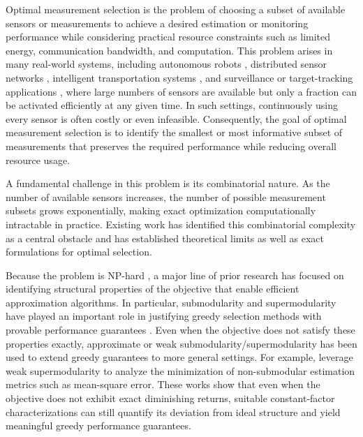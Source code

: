 \documentclass[letterpaper, 10 pt, conference]{ieeeconf}  %
\begin{document}
Optimal measurement selection is the problem of choosing a subset of available sensors or measurements to achieve a desired estimation or monitoring performance while considering practical resource constraints such as limited energy, communication bandwidth, and computation. This problem arises in many real-world systems, including autonomous robots \cite{c1,c2}, distributed sensor networks \cite{c3,c4}, intelligent transportation systems \cite{c5}, and surveillance or target-tracking applications \cite{c6,c7}, where large numbers of sensors are available but only a fraction can be activated efficiently at any given time. In such settings, continuously using every sensor is often costly or even infeasible. Consequently, the goal of optimal measurement selection is to identify the smallest or most informative subset of measurements that preserves the required performance while reducing overall resource usage.

A fundamental challenge in this problem is its combinatorial nature. As the number of available sensors increases, the number of possible measurement subsets grows exponentially, making exact optimization computationally intractable in practice. Existing work \cite{c8,c9,c10} has identified this combinatorial complexity as a central obstacle and has established theoretical limits as well as exact formulations for optimal selection.

Because the problem is NP-hard \cite{c10,c11}, a major line of prior research has focused on identifying structural properties of the objective that enable efficient approximation algorithms. In particular, submodularity and supermodularity have played an important role in justifying greedy selection methods with provable performance guarantees \cite{c12,c13,c14}. Even when the objective does not satisfy these properties exactly, approximate or weak submodularity/supermodularity has been used to extend greedy guarantees to more general settings. For example, \cite{c15,c16} leverage weak supermodularity to analyze the minimization of non-submodular estimation metrics such as mean-square error. These works show that even when the objective does not exhibit exact diminishing returns, suitable constant-factor characterizations can still quantify its deviation from ideal structure and yield meaningful greedy performance guarantees.
\end{document}
